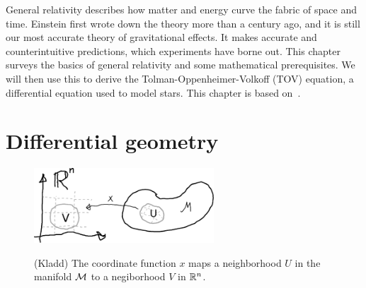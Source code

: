 
General relativity describes how matter and energy curve the fabric of space and time.
Einstein first wrote down the theory more than a century ago, and it is still our most accurate theory of gravitational effects.
It makes accurate and counterintuitive predictions, which experiments have borne out.
This chapter surveys the basics of general relativity and some mathematical prerequisites.
We will then use this to derive the Tolman-Oppenheimer-Volkoff (TOV) equation, a differential equation used to model stars.
This chapter is based on~\autocite{carrollSpacetimeGeometryIntroduction2019,leeSmoothManifolds2012}.

\section{Differential geometry}

\begin{figure}[ht]
    \centering
    \includegraphics[width=0.6\textwidth]{figurer/coordinate_function.pdf}
    \label{coordinate function}
    \caption{(Kladd) The coordinate function $x$ maps a neighborhood $U$ in the manifold $\mathcal{M}$ to a negiborhood $V$ in $\mathbb{R}^n$.}
\end{figure}


